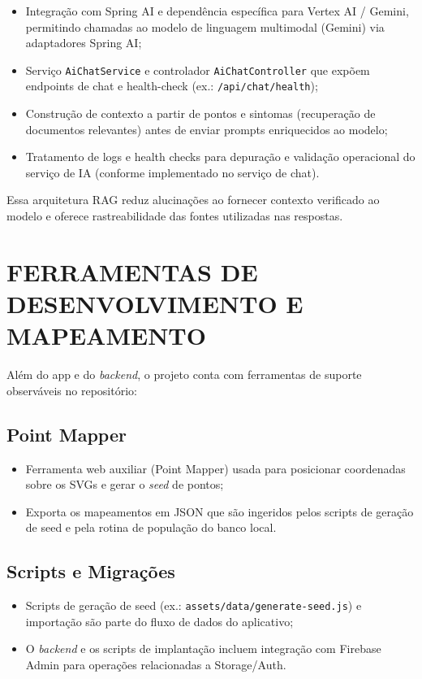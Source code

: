 \begin{itemize}
    \item Integração com Spring AI e dependência específica para Vertex AI / Gemini, permitindo chamadas ao modelo de linguagem multimodal (Gemini) via adaptadores Spring AI;
    \item Serviço \texttt{AiChatService} e controlador \texttt{AiChatController} que expõem endpoints de chat e health-check (ex.: \texttt{/api/chat/health});
    \item Construção de contexto a partir de pontos e sintomas (recuperação de documentos relevantes) antes de enviar prompts enriquecidos ao modelo;
    \item Tratamento de logs e health checks para depuração e validação operacional do serviço de IA (conforme implementado no serviço de chat).
\end{itemize}

Essa arquitetura RAG reduz alucinações ao fornecer contexto verificado ao modelo e oferece rastreabilidade das fontes utilizadas nas respostas.

\section{FERRAMENTAS DE DESENVOLVIMENTO E MAPEAMENTO} \label{sec:ferramentas}

Além do app e do \textit{backend}, o projeto conta com ferramentas de suporte observáveis no repositório:

\subsection{Point Mapper}

\begin{itemize}
    \item Ferramenta web auxiliar (Point Mapper) usada para posicionar coordenadas sobre os SVGs e gerar o \textit{seed} de pontos;
    \item Exporta os mapeamentos em JSON que são ingeridos pelos scripts de geração de seed e pela rotina de popula\c{c}\~ao do banco local.
\end{itemize}

\subsection{Scripts e Migrações}

\begin{itemize}
    \item Scripts de geração de seed (ex.: \texttt{assets/data/generate-seed.js}) e importação são parte do fluxo de dados do aplicativo;
    \item O \textit{backend} e os scripts de implantação incluem integração com Firebase Admin para operações relacionadas a Storage/Auth.
\end{itemize}

